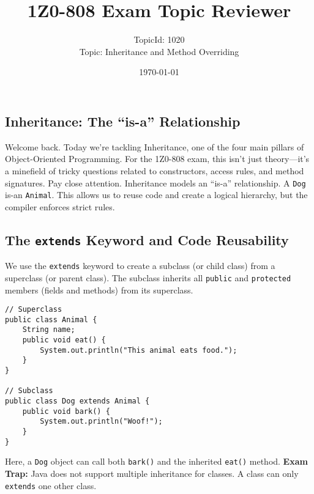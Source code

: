 \documentclass[12pt]{article}
\title{\textbf{1Z0-808 Exam Topic Reviewer}}
\author{TopicId: 1020 \\ Topic: Inheritance and Method Overriding}
\date{\today}
\begin{document}
\maketitle
\newpage\begin{enumerate}[label=(\arabic*)]
\section*{Inheritance: The ``is-a'' Relationship}
Welcome back. Today we're tackling Inheritance, one of the four main pillars of Object-Oriented Programming. For the 1Z0-808 exam, this isn't just theory---it's a minefield of tricky questions related to constructors, access rules, and method signatures. Pay close attention. Inheritance models an ``is-a'' relationship. A \texttt{Dog} is-an \texttt{Animal}. This allows us to reuse code and create a logical hierarchy, but the compiler enforces strict rules.

\subsection{The \texttt{extends} Keyword and Code Reusability}
We use the \texttt{extends} keyword to create a subclass (or child class) from a superclass (or parent class). The subclass inherits all \texttt{public} and \texttt{protected} members (fields and methods) from its superclass.
\begin{verbatim}
// Superclass
public class Animal {
    String name;
    public void eat() {
        System.out.println("This animal eats food.");
    }
}

// Subclass
public class Dog extends Animal {
    public void bark() {
        System.out.println("Woof!");
    }
}
\end{verbatim}
Here, a \texttt{Dog} object can call both \texttt{bark()} and the inherited \texttt{eat()} method. \textbf{Exam Trap:} Java does not support multiple inheritance for classes. A class can only \texttt{extends} one other class. 


\end{enumerate}
\end{document}
